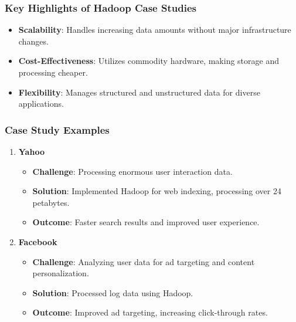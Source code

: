 \documentclass[aspectratio=169]{beamer}
\begin{document}
\begin{frame}[fragile]
    \frametitle{Key Highlights of Hadoop Case Studies}
    \begin{itemize}
        \item \textbf{Scalability}: Handles increasing data amounts without major infrastructure changes.
        \item \textbf{Cost-Effectiveness}: Utilizes commodity hardware, making storage and processing cheaper.
        \item \textbf{Flexibility}: Manages structured and unstructured data for diverse applications.
    \end{itemize}
\end{frame}

\begin{frame}[fragile]
    \frametitle{Case Study Examples}
    \begin{enumerate}
        \item \textbf{Yahoo}
            \begin{itemize}
                \item \textbf{Challenge}: Processing enormous user interaction data.
                \item \textbf{Solution}: Implemented Hadoop for web indexing, processing over 24 petabytes.
                \item \textbf{Outcome}: Faster search results and improved user experience.
            \end{itemize}
        \item \textbf{Facebook}
            \begin{itemize}
                \item \textbf{Challenge}: Analyzing user data for ad targeting and content personalization.
                \item \textbf{Solution}: Processed log data using Hadoop.
                \item \textbf{Outcome}: Improved ad targeting, increasing click-through rates.
            \end{itemize}
    \end{enumerate}
\end{frame}
\end{document}
